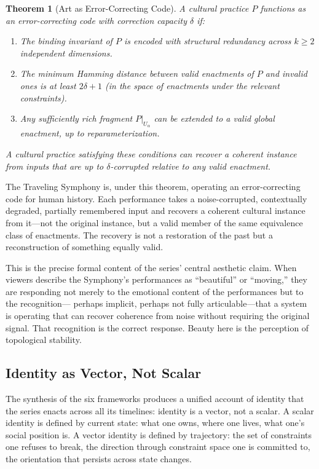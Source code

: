 \documentclass[12pt, oneside]{article}
\theoremstyle{plain}
\newtheorem{theorem}{Theorem}[section]
\theoremstyle{definition}
\theoremstyle{remark}
\begin{document}
\begin{theorem}[Art as Error-Correcting Code]
\label{thm:error-correction}
A cultural practice $P$ functions as an error-correcting code with
correction capacity $\delta$ if:
\begin{enumerate}
  \item The binding invariant of $P$ is encoded with structural
  redundancy across $k \geq 2$ independent dimensions.
  \item The minimum Hamming distance between valid enactments of
  $P$ and invalid ones is at least $2\delta + 1$ (in the space of
  enactments under the relevant constraints).
  \item Any sufficiently rich fragment $P|_{U_\alpha}$ can be
  extended to a valid global enactment, up to reparameterization.
\end{enumerate}
A cultural practice satisfying these conditions can recover a
coherent instance from inputs that are up to $\delta$-corrupted
relative to any valid enactment.
\end{theorem}

The Traveling Symphony is, under this theorem, operating an
error-correcting code for human history. Each performance takes a
noise-corrupted, contextually degraded, partially remembered input
and recovers a coherent cultural instance from it---not the original
instance, but a valid member of the same equivalence class of
enactments. The recovery is not a restoration of the past but a
reconstruction of something equally valid.

This is the precise formal content of the series' central aesthetic
claim. When viewers describe the Symphony's performances as
``beautiful'' or ``moving,'' they are responding not merely to the
emotional content of the performances but to the recognition---
perhaps implicit, perhaps not fully articulable---that a system is
operating that can recover coherence from noise without requiring
the original signal. That recognition is the correct response.
Beauty here is the perception of topological stability.

\subsection{Identity as Vector, Not Scalar}

The synthesis of the six frameworks produces a unified account of
identity that the series enacts across all its timelines: identity
is a vector, not a scalar. A scalar identity is defined by current
state: what one owns, where one lives, what one's social position
is. A vector identity is defined by trajectory: the set of
constraints one refuses to break, the direction through constraint
space one is committed to, the orientation that persists across
state changes.
\end{document}
